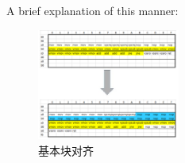 \begin{center}
    A brief explanation of this manner:
\end{center}

\begin{figure}[H]
    \centering
    \includegraphics[width=0.418\textwidth]{images/alignment.png}
    \caption{基本块对齐}
\end{figure}